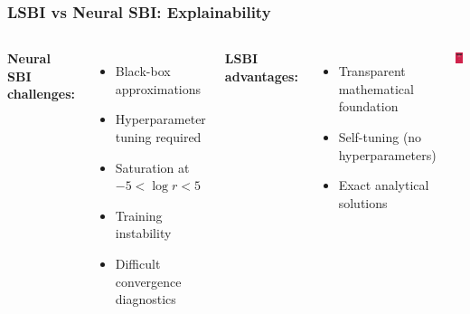 \documentclass[aspectratio=169]{beamer}
\begin{document}
\begin{frame}
    \frametitle{LSBI vs Neural SBI: Explainability}
    \begin{columns}
        \textbf{Neural SBI challenges:}
        \begin{itemize}
            \item Black-box approximations
            \item Hyperparameter tuning required
            \item Saturation at $-5 < \log r < 5$
            \item Training instability
            \item Difficult convergence diagnostics
        \end{itemize}
        
        \vspace{0.3cm}
        \textbf{LSBI advantages:}
        \begin{itemize}
            \item Transparent mathematical foundation
            \item Self-tuning (no hyperparameters)
            \item Exact analytical solutions
        \end{itemize}

        \includegraphics[width=\textwidth]{figures/matrix_variate_distributions.jpg}
        

\end{columns}
\end{frame}
\end{document}
